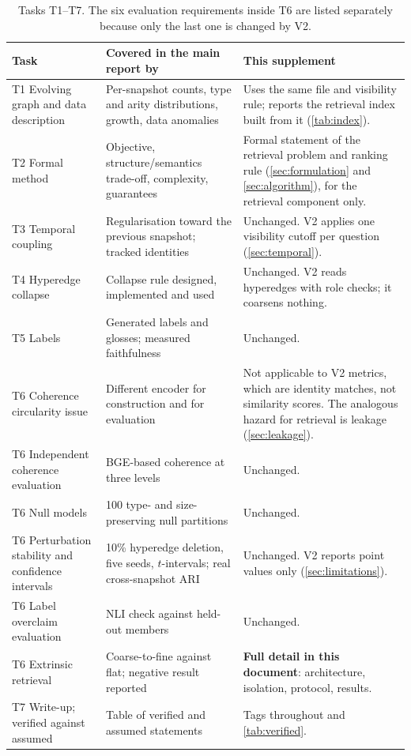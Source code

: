 \documentclass[11pt,a4paper]{article}
\newcommand{\cref}[1]{\autoref{#1}}
\theoremstyle{remark}
\begin{document}
\begin{table}[!htbp]
\centering
\caption[Tasks T1--T7 and their relation to V2]{Tasks T1--T7. The six evaluation requirements inside T6 are listed separately
because only the last one is changed by V2.}
\label{tab:t-mapping}
\small
\begin{tabularx}{\linewidth}{p{3.7cm}p{4.9cm}X}
\toprule
Task & Covered in the main report by & This supplement\\
\midrule
T1 Evolving graph and data description & Per-snapshot counts, type and arity
  distributions, growth, data anomalies &
  Uses the same file and visibility rule; reports the retrieval index built from it
  (\cref{tab:index}).\\
T2 Formal method & Objective, structure/semantics trade-off, complexity, guarantees &
  Formal statement of the retrieval problem and ranking rule
  (\cref{sec:formulation} and \cref{sec:algorithm}), for the retrieval component only.\\
T3 Temporal coupling & Regularisation toward the previous snapshot; tracked identities &
  Unchanged. V2 applies one visibility cutoff per question (\cref{sec:temporal}).\\
T4 Hyperedge collapse & Collapse rule designed, implemented and used &
  Unchanged. V2 reads hyperedges with role checks; it coarsens nothing.\\
T5 Labels & Generated labels and glosses; measured faithfulness & Unchanged.\\
\midrule
T6 Coherence circularity issue & Different encoder for construction and for evaluation &
  Not applicable to V2 metrics, which are identity matches, not similarity scores. The
  analogous hazard for retrieval is leakage (\cref{sec:leakage}).\\
T6 Independent coherence evaluation & BGE-based coherence at three levels & Unchanged.\\
T6 Null models & 100 type- and size-preserving null partitions & Unchanged.\\
T6 Perturbation stability and confidence intervals & 10\% hyperedge deletion, five seeds,
  $t$-intervals; real cross-snapshot ARI & Unchanged. V2 reports point values only
  (\cref{sec:limitations}).\\
T6 Label overclaim evaluation & NLI check against held-out members & Unchanged.\\
T6 Extrinsic retrieval & Coarse-to-fine against flat; negative result reported &
  \textbf{Full detail in this document}: architecture, isolation, protocol, results.\\
\midrule
T7 Write-up; verified against assumed & Table of verified and assumed statements &
  Tags throughout and \cref{tab:verified}.\\
\bottomrule
\end{tabularx}
\end{table}
\end{document}
